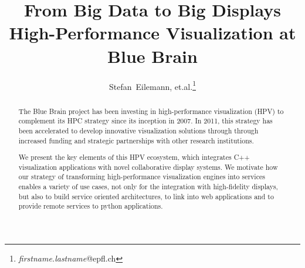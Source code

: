 \documentclass[10pt]{llncs}
\begin{document}
\lstset{language=[11]C++,basicstyle=\scriptsize,captionpos=b}
%
\title{From Big Data to Big Displays\\
High-Performance Visualization at Blue Brain}

%
%
%
%

\author{Stefan~Eilemann, et.al.\thanks{\textit{firstname.lastname}@epfl.ch}}

\maketitle


\begin{abstract}
  The Blue Brain project has been investing in high-performance visualization
  (HPV) to complement its HPC strategy since its inception in 2007. In 2011,
  this strategy has been accelerated to develop innovative visualization
  solutions through through increased funding and strategic partnerships with
  other research institutions.

  We present the key elements of this HPV ecosystem, which integrates C++
  visualization applications with novel collaborative display systems. We
  motivate how our strategy of transforming high-performance visualization
  engines into services enables a variety of use cases, not only for the
  integration with high-fidelity displays, but also to build service oriented
  architectures, to link into web applications and to provide remote services to
  python applications.
\end{abstract}
\end{document}

